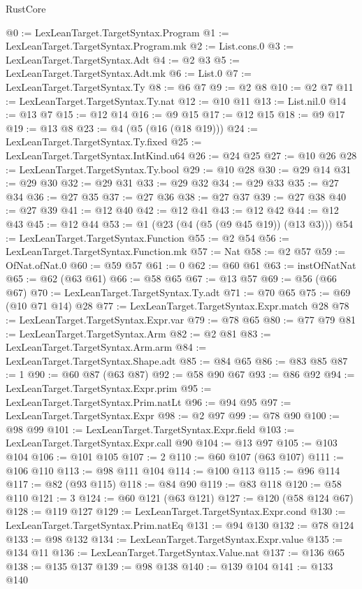\begin{lexlean}{RustCore}
\begin{coremodule}
@0 := LexLeanTarget.TargetSyntax.Program
@1 := LexLeanTarget.TargetSyntax.Program.mk
@2 := List.cons.{0}
@3 := LexLeanTarget.TargetSyntax.Adt
@4 := @2 @3
@5 := LexLeanTarget.TargetSyntax.Adt.mk
@6 := List.{0}
@7 := LexLeanTarget.TargetSyntax.Ty
@8 := @6 @7
@9 := @2 @8
@10 := @2 @7
@11 := LexLeanTarget.TargetSyntax.Ty.nat
@12 := @10 @11
@13 := List.nil.{0}
@14 := @13 @7
@15 := @12 @14
@16 := @9 @15
@17 := @12 @15
@18 := @9 @17
@19 := @13 @8
@23 := @4 (@5 (@16 (@18 @19)))
@24 := LexLeanTarget.TargetSyntax.Ty.fixed
@25 := LexLeanTarget.TargetSyntax.IntKind.u64
@26 := @24 @25
@27 := @10 @26
@28 := LexLeanTarget.TargetSyntax.Ty.bool
@29 := @10 @28
@30 := @29 @14
@31 := @29 @30
@32 := @29 @31
@33 := @29 @32
@34 := @29 @33
@35 := @27 @34
@36 := @27 @35
@37 := @27 @36
@38 := @27 @37
@39 := @27 @38
@40 := @27 @39
@41 := @12 @40
@42 := @12 @41
@43 := @12 @42
@44 := @12 @43
@45 := @12 @44
@53 := @1 (@23 (@4 (@5 (@9 @45 @19)) (@13 @3)))
@54 := LexLeanTarget.TargetSyntax.Function
@55 := @2 @54
@56 := LexLeanTarget.TargetSyntax.Function.mk
@57 := Nat
@58 := @2 @57
@59 := OfNat.ofNat.{0}
@60 := @59 @57
@61 := 0
@62 := @60 @61
@63 := instOfNatNat
@65 := @62 (@63 @61)
@66 := @58 @65
@67 := @13 @57
@69 := @56 (@66 @67)
@70 := LexLeanTarget.TargetSyntax.Ty.adt
@71 := @70 @65
@75 := @69 (@10 @71 @14) @28
@77 := LexLeanTarget.TargetSyntax.Expr.match @28
@78 := LexLeanTarget.TargetSyntax.Expr.var
@79 := @78 @65
@80 := @77 @79
@81 := LexLeanTarget.TargetSyntax.Arm
@82 := @2 @81
@83 := LexLeanTarget.TargetSyntax.Arm.arm
@84 := LexLeanTarget.TargetSyntax.Shape.adt
@85 := @84 @65
@86 := @83 @85
@87 := 1
@90 := @60 @87 (@63 @87)
@92 := @58 @90 @67
@93 := @86 @92
@94 := LexLeanTarget.TargetSyntax.Expr.prim
@95 := LexLeanTarget.TargetSyntax.Prim.natLt
@96 := @94 @95
@97 := LexLeanTarget.TargetSyntax.Expr
@98 := @2 @97
@99 := @78 @90
@100 := @98 @99
@101 := LexLeanTarget.TargetSyntax.Expr.field
@103 := LexLeanTarget.TargetSyntax.Expr.call @90
@104 := @13 @97
@105 := @103 @104
@106 := @101 @105
@107 := 2
@110 := @60 @107 (@63 @107)
@111 := @106 @110
@113 := @98 @111 @104
@114 := @100 @113
@115 := @96 @114
@117 := @82 (@93 @115)
@118 := @84 @90
@119 := @83 @118
@120 := @58 @110
@121 := 3
@124 := @60 @121 (@63 @121)
@127 := @120 (@58 @124 @67)
@128 := @119 @127
@129 := LexLeanTarget.TargetSyntax.Expr.cond
@130 := LexLeanTarget.TargetSyntax.Prim.natEq
@131 := @94 @130
@132 := @78 @124
@133 := @98 @132
@134 := LexLeanTarget.TargetSyntax.Expr.value
@135 := @134 @11
@136 := LexLeanTarget.TargetSyntax.Value.nat
@137 := @136 @65
@138 := @135 @137
@139 := @98 @138
@140 := @139 @104
@141 := @133 @140

\end{coremodule}
\end{lexlean}

